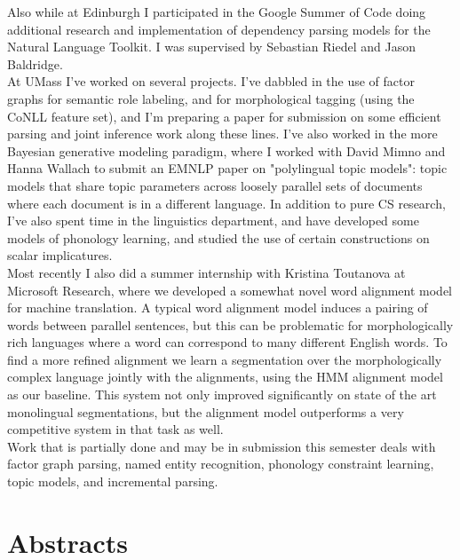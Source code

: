 \documentclass[11pt, a4paper]{article}
\begin{document}
Also while at Edinburgh I participated in the Google Summer of Code
doing additional research and implementation of dependency parsing
models for the Natural Language Toolkit.  I was supervised by 
Sebastian Riedel and Jason Baldridge.\\

At UMass I've worked on several projects.  I've dabbled in the use of
factor graphs for semantic role labeling, and for morphological tagging
(using the CoNLL feature set), and I'm preparing a paper for submission
on some efficient parsing and joint inference work along these lines.  I've
also worked in the more Bayesian generative modeling paradigm, where
I worked with David Mimno and Hanna Wallach to submit an EMNLP paper
on "polylingual topic models": topic models that share topic parameters across
loosely parallel sets of documents where each document is in a different language.
In addition to pure CS research, I've also spent time in the linguistics department,
and have developed some models of phonology learning, and studied the
use of certain constructions on scalar implicatures.\\

Most recently I also did a summer internship with Kristina Toutanova at Microsoft
Research, where we developed a somewhat novel word alignment model for
machine translation.  A typical word alignment model induces a pairing of
words between parallel sentences, but this can be problematic for morphologically
rich languages where a word can correspond to many different English words.  To
find a more refined alignment we learn a segmentation over the morphologically
complex language jointly with the alignments, using the HMM alignment model
as our baseline.  This system not only improved significantly on state of the art
monolingual segmentations, but the alignment model outperforms a very
competitive system in that task as well.\\

Work that is partially done and may be in submission this semester deals with 
factor graph parsing, named entity recognition, phonology constraint learning,
topic models, and incremental parsing.\\





\section*{Abstracts}
\end{document}
